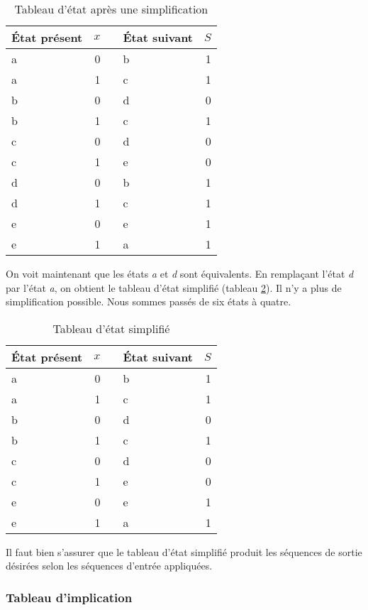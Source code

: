\documentclass[11pt]{article}
\begin{document}
\begin{table}[htbp]
\caption{\label{tab:org365ac9a}Tableau d'état après une simplification}
\centering
\begin{tabular}{lrllr}
État présent & \(x\) &  & État suivant & \(S\)\\
\hline
a & 0 &  & b & 1\\
a & 1 &  & c & 1\\
b & 0 &  & d & 0\\
b & 1 &  & c & 1\\
c & 0 &  & d & 0\\
c & 1 &  & e & 0\\
d & 0 &  & b & 1\\
d & 1 &  & c & 1\\
e & 0 &  & e & 1\\
e & 1 &  & a & 1\\
\end{tabular}
\end{table}

On voit maintenant que les états \emph{a} et \emph{d} sont équivalents. En
remplaçant l'état \emph{d} par l'état \emph{a}, on obtient le tableau d'état
simplifié (tableau \ref{tab:org73f8822}). Il n'y a plus de simplification
possible. Nous sommes passés de six états à quatre.

\begin{table}[htbp]
\caption{\label{tab:org73f8822}Tableau d'état simplifié}
\centering
\begin{tabular}{lrllr}
État présent & \(x\) &  & État suivant & \(S\)\\
\hline
a & 0 &  & b & 1\\
a & 1 &  & c & 1\\
b & 0 &  & d & 0\\
b & 1 &  & c & 1\\
c & 0 &  & d & 0\\
c & 1 &  & e & 0\\
e & 0 &  & e & 1\\
e & 1 &  & a & 1\\
\end{tabular}
\end{table}

Il faut bien s'assurer que le tableau d'état simplifié produit les
séquences de sortie désirées selon les séquences d'entrée appliquées.

\subsubsection{Tableau d'implication}
\label{sec:orgc277e6f}
\end{document}
